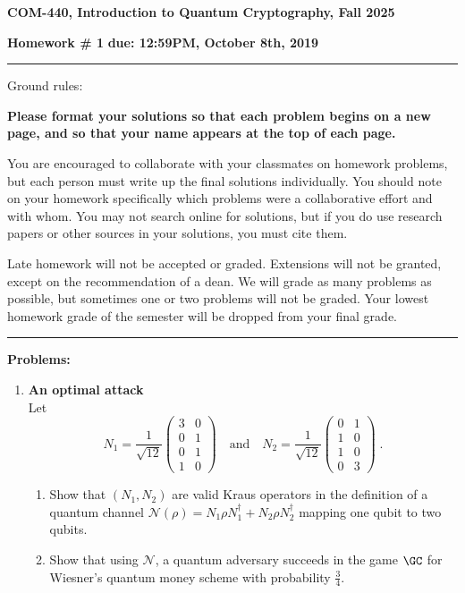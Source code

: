 \documentclass[12pt]{article}
\newcommand{\header}[1]{\begin{center} {\large\bf #1} \end{center}}
\begin{document}
\header{COM-440, Introduction to Quantum Cryptography, Fall 2025}
{\bf Homework \# 1} \hfill {\bf due: 12:59PM, October 8th, 2019}


\medskip

\hrule

\medskip 

Ground rules: 

{\bf Please
  format your solutions so that each problem begins on a new page, and
  so that your name appears at the top of each page.}

You are encouraged to collaborate with your classmates on
homework problems, but each person must write up the final solutions
individually. You should note on your homework specifically which
problems were a collaborative effort and with whom. You may not search
online for solutions, but if you do use research papers or other
sources in your solutions, you must cite them.

Late homework will not be accepted or graded. Extensions will not be granted, except on the recommendation of a dean. We will grade as many problems as possible, but sometimes one or two problems will not be graded. Your lowest homework grade of the semester will be dropped from your final grade.


\medskip

\hrule

 
\medskip
{\bf Problems:}

\begin{enumerate}
		

\item  {\bf An optimal attack}\label{ex:opt-wiesner}\\
Let 
\[ N_1 = \frac{1}{\sqrt{12}} \begin{pmatrix} 3 & 0 \\ 0 & 1 \\ 0 & 1 \\ 1 & 0 \end{pmatrix} \quad \text{and}\quad N_2 = \frac{1}{\sqrt{12}} \begin{pmatrix} 0 & 1 \\ 1 & 0 \\ 1 & 0 \\ 0 & 3\end{pmatrix}\;.\]
\begin{enumerate}
\item Show that $(N_1,N_2)$ are valid Kraus operators in the definition of a quantum channel $\mathcal{N}(\rho)=N_1\rho N_1^\dagger + N_2 \rho N_2^\dagger$ mapping one qubit to two qubits. 
\item Show that using $\mathcal{N}$, a quantum adversary succeeds in the game $\GC$ for Wiesner's quantum money scheme with probability $\frac{3}{4}$. 
\end{enumerate}


\end{enumerate}
\end{document}
